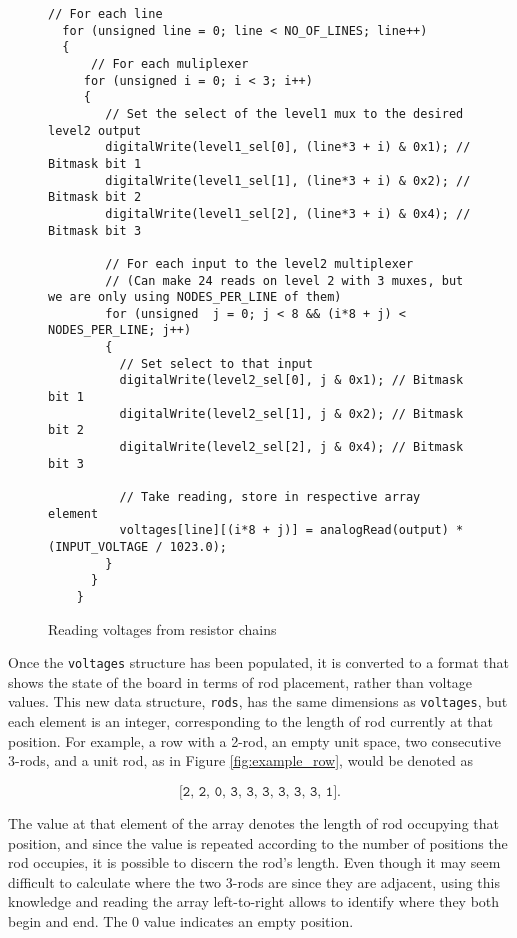 \begin{figure}[H]
\centering
\begin{verbatim}
// For each line
  for (unsigned line = 0; line < NO_OF_LINES; line++)
  {
      // For each muliplexer
     for (unsigned i = 0; i < 3; i++)
     {
        // Set the select of the level1 mux to the desired level2 output
        digitalWrite(level1_sel[0], (line*3 + i) & 0x1); // Bitmask bit 1
        digitalWrite(level1_sel[1], (line*3 + i) & 0x2); // Bitmask bit 2
        digitalWrite(level1_sel[2], (line*3 + i) & 0x4); // Bitmask bit 3

        // For each input to the level2 multiplexer
        // (Can make 24 reads on level 2 with 3 muxes, but we are only using NODES_PER_LINE of them)
        for (unsigned  j = 0; j < 8 && (i*8 + j) < NODES_PER_LINE; j++) 
        {
          // Set select to that input
          digitalWrite(level2_sel[0], j & 0x1); // Bitmask bit 1
          digitalWrite(level2_sel[1], j & 0x2); // Bitmask bit 2
          digitalWrite(level2_sel[2], j & 0x4); // Bitmask bit 3

          // Take reading, store in respective array element
          voltages[line][(i*8 + j)] = analogRead(output) * (INPUT_VOLTAGE / 1023.0);
        }
      }
    }
\end{verbatim}
\caption{Reading voltages from resistor chains}
\label{lst:read_voltages}
\end{figure}

Once the \texttt{voltages} structure has been populated, it is converted to a format that shows the state of the board in terms of rod placement, rather than voltage values. This new data structure, \texttt{rods}, has the same dimensions as \texttt{voltages}, but each element is an integer, corresponding to the length of rod currently at that position. For example, a row with a 2-rod, an empty unit space, two consecutive 3-rods, and a unit rod, as in Figure \ref{fig:example_row}, would be denoted as 


$$\texttt{[2, 2, 0, 3, 3, 3, 3, 3, 3, 1].}$$


The value at that element of the array denotes the length of rod occupying that position, and since the value is repeated according to the number of positions the rod occupies, it is possible to discern the rod's length. Even though it may seem difficult to calculate where the two 3-rods are since they are adjacent, using this knowledge and reading the array left-to-right allows to identify where they both begin and end. The 0 value indicates an empty position. \\

